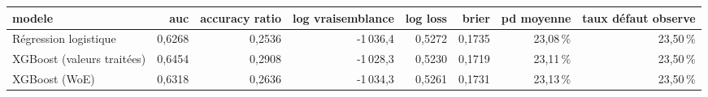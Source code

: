 \begin{tabular}{lrrrrrrr}
\toprule
\textbf{modele} & \textbf{auc} & \textbf{accuracy ratio} & \textbf{log vraisemblance} & \textbf{log loss} & \textbf{brier} & \textbf{pd moyenne} & \textbf{taux défaut observe} \\
\midrule
Régression logistique & 0,6268 & 0,2536 & -1\,036,4 & 0,5272 & 0,1735 & 23,08\,\% & 23,50\,\% \\
XGBoost (valeurs traitées) & 0,6454 & 0,2908 & -1\,028,3 & 0,5230 & 0,1719 & 23,11\,\% & 23,50\,\% \\
XGBoost (WoE) & 0,6318 & 0,2636 & -1\,034,3 & 0,5261 & 0,1731 & 23,13\,\% & 23,50\,\% \\
\bottomrule
\end{tabular}
